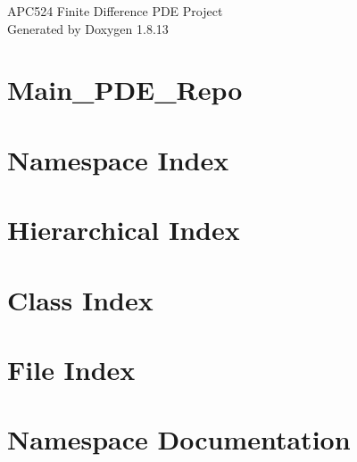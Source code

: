 \documentclass[twoside]{book}
\newcommand{\+}{\discretionary{\mbox{\scriptsize$\hookleftarrow$}}{}{}}
\newcommand{\clearemptydoublepage}{%
  \newpage{\pagestyle{empty}\cleardoublepage}%
}
\begin{document}
\hypersetup{pageanchor=false,
             bookmarksnumbered=true,
             pdfencoding=unicode
            }
\begin{titlepage}
\vspace*{7cm}
\begin{center}%
{\Large A\+P\+C524 Finite Difference P\+DE Project }\\
\vspace*{1cm}
{\large Generated by Doxygen 1.8.13}\\
\end{center}
\end{titlepage}
\clearemptydoublepage
{}
\tableofcontents
\clearemptydoublepage
{}
\hypersetup{pageanchor=true}

\chapter{Main\+\_\+\+P\+D\+E\+\_\+\+Repo}
\label{md_README}

\chapter{Namespace Index}

\chapter{Hierarchical Index}

\chapter{Class Index}

\chapter{File Index}

\chapter{Namespace Documentation}






















\end{document}
